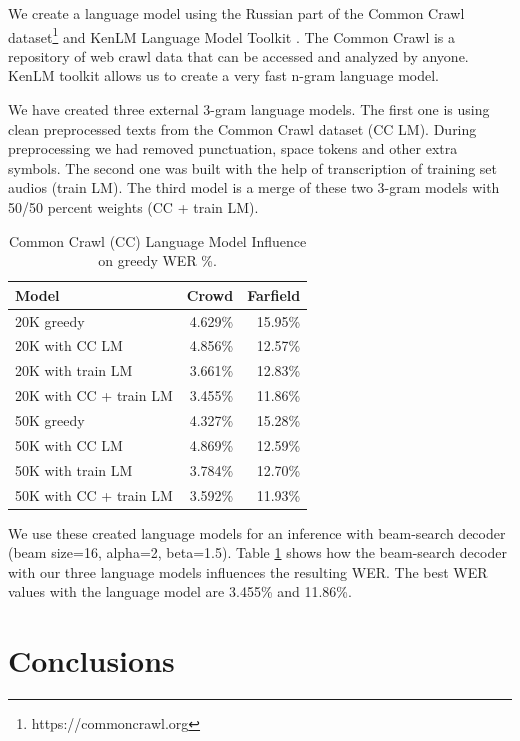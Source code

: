 \documentclass[a4paper]{article}
\begin{document}
We create a language model using the Russian part of the Common Crawl dataset\footnote{https://commoncrawl.org} and KenLM Language Model Toolkit \cite{heafield-2011-kenlm}. The Common Crawl is a repository of web crawl data that can be accessed and analyzed by anyone. KenLM toolkit allows us to create a very fast n-gram language model.

We have created three external 3-gram language models. The first one is using clean preprocessed texts from the Common Crawl dataset (CC LM). During preprocessing we had removed punctuation, space tokens and other extra symbols. The second one was built with the help of transcription of training set audios (train LM). The third model is a merge of these two 3-gram models with 50/50 percent weights (CC + train LM).

\begin{table}[t]
  \caption{Common Crawl (CC) Language Model Influence on greedy WER \%.}
  \label{tab:language_model}
  \centering
  \begin{tabular}{lrr}
    \toprule
    \textbf{Model}      & \textbf{Crowd}     & \textbf{Farfield} \\
    \midrule
    20K greedy & 4.629\%  & 15.95\%    \\
    20K with CC LM & 4.856\% & 12.57\%   \\
    20K with train LM & 3.661\% & 12.83\% \\
    20K with CC + train LM & 3.455\% & 11.86\% \\
    
    \midrule
    50K greedy & 4.327\% & 15.28\%   \\
    50K with CC LM & 4.869\% & 12.59\%   \\
    50K with train LM & 3.784\% & 12.70\%   \\
    50K with CC + train LM & 3.592\% & 11.93\%   \\
    \bottomrule
  \end{tabular}
\end{table}

We use these created language models for an inference with beam-search decoder (beam size=16, alpha=2, beta=1.5). Table \ref{tab:language_model} shows how the beam-search decoder with our three language models influences the resulting WER. The best WER values with the language model are 3.455\% and 11.86\%. 


\section{Conclusions}
\end{document}
